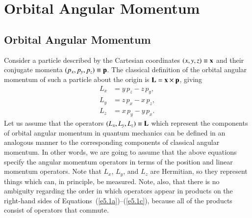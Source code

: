 \chapter{Orbital Angular Momentum}\label{ch4}

\section{Orbital Angular Momentum}\label{s5.1}
Consider a particle described by the Cartesian coordinates 
$(x, y, z)\equiv {\bf x}$
 and their conjugate momenta $(p_x, p_y, p_z)\equiv {\bf p}$. The classical
definition of the orbital angular momentum of such a particle about the
origin is ${\bf L} = {\bf x}\times{\bf p}$, giving
\begin{align}\label{e5.1a}
L_x &= y\, p_z - z\, p_y,\\[0.5ex]
L_y &= z\, p_x - x\, p_z,\\[0.5ex]
L_z &= x\,p_y - y \,p_x.\label{e5.1c}
\end{align}
Let us assume that the operators $(L_x, L_y, L_z)\equiv {\bf L}$ which
represent the components of
orbital angular momentum in quantum mechanics can be defined in
an analogous manner to the corresponding components of
classical angular momentum. In other words, we are 
going to assume that the above equations specify  the angular momentum operators
in terms of the position and linear momentum operators. Note that $L_x$, $L_y$,
and $L_z$ are Hermitian, so they represent things which can, in principle,
be measured. Note, also, that there is no ambiguity regarding the order
in which operators appear in products on the right-hand sides of Equations~(\ref{e5.1a})--(\ref{e5.1c}),
because all of the products consist of operators that commute. 

